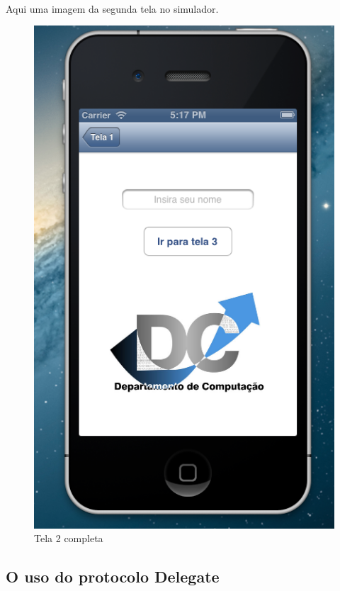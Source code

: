 \documentclass[a4paper,12pt,brazil,doubleside]{book}
\begin{document}
\paragraph{}Aqui uma imagem da segunda tela no simulador.\\

\bigskip
\bigskip

\begin{figure}[h]
  \centering
  \includegraphics[totalheight=0.4\textheight]{../figuras/ios/2/simulador2_tela2.png}
  \caption{Tela 2 completa}
  \label{fig:a}
\end{figure}

\bigskip

\subsection{O uso do protocolo Delegate}
\end{document}
